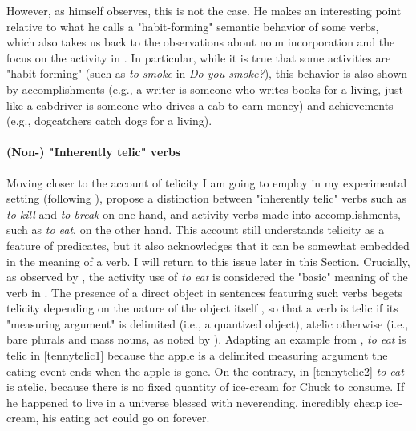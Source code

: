 However, as \textcite[151]{Vendler1957} himself observes, this is not the case. He makes an interesting point relative to what he calls a "habit-forming" semantic behavior of some verbs, which also takes us back to the observations about noun incorporation and the focus on the activity in . In particular, while it is true that some activities are "habit-forming" (such as \textit{to smoke} in \textit{Do you smoke?}), this behavior is also shown by accomplishments (e.g., a writer is someone who writes books for a living, just like a cabdriver is someone who drives a cab to earn money) and achievements (e.g., dogcatchers catch dogs for a living).

\paragraph{(Non-) "Inherently telic" verbs}
Moving closer to the account of telicity I am going to employ in my experimental setting (following \textcite{Medina2007}), \textcite[112]{vanvalinlapolla1997syntax} propose a distinction between "inherently telic" verbs such as \textit{to kill} and \textit{to break} on one hand, and activity verbs made into accomplishments, such as \textit{to eat}, on the other hand. This account still understands telicity as a feature of predicates, but it also acknowledges that it can be somewhat embedded in the meaning of a verb. I will return to this issue later in this Section. Crucially, as observed by \textcite[5-6]{NewmanRice2006}, the activity use of \textit{to eat} is considered the "basic" meaning of the verb in \textcite{vanvalinlapolla1997syntax}. The presence of a direct object in sentences featuring such verbs begets telicity depending on the nature of the object itself \parencite{tenny1994aspectual, dowty1991thematic, filip2004telicity}, so that a verb is telic if its "measuring argument" is delimited (i.e., a quantized object), atelic otherwise (i.e., bare plurals and mass nouns, as noted by \textcite{verkuyl1972compositional, verkuyl1989aspectual}). Adapting an example from \textcite[24]{tenny1994aspectual}, \textit{to eat} is telic in \ref{tennytelic1} because the apple is a delimited measuring argument \textemdash the eating event ends when the apple is gone. On the contrary, in \ref{tennytelic2} \textit{to eat} is atelic, because there is no fixed quantity of ice-cream for Chuck to consume. If he happened to live in a universe blessed with neverending, incredibly cheap ice-cream, his eating act could go on forever.

